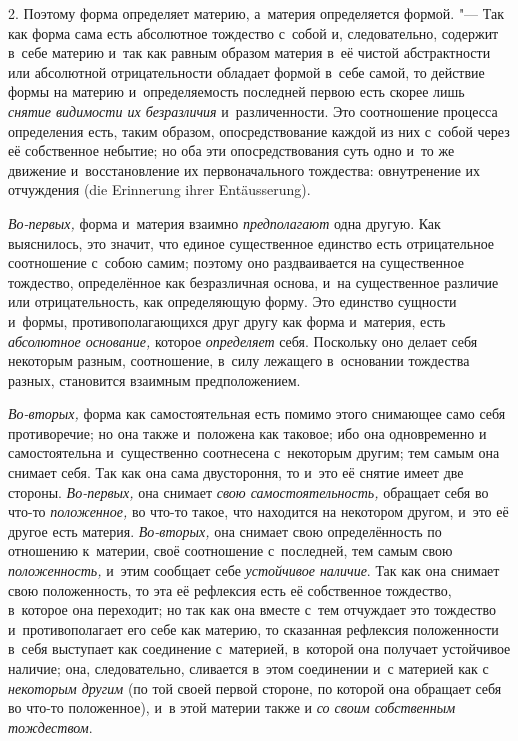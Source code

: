 2. Поэтому форма определяет материю, а~материя определяется формой. "--- Так
как форма сама есть абсолютное тождество с~собой и, следовательно, содержит
в~себе материю и~так как равным образом материя в~её чистой абстрактности или
абсолютной отрицательности обладает формой в~себе самой, то действие формы на
материю и~определяемость последней первою есть скорее лишь
{\em снятие видимости их безразличия} и~различенности. Это соотношение процесса
определения есть, таким образом, опосредствование каждой из них с~собой через
её собственное небытие; но оба эти опосредствования суть одно и~то же движение
и~восстановление их первоначального тождества: овнутренение их отчуждения (die
Erinne\-rung ihrer Entäus\-se\-rung).

{\em Во-первых,} форма и~материя взаимно {\em предполагают} одна другую. Как
выяснилось, это значит, что единое существенное единство есть отрицательное
соотношение с~собою самим; поэтому оно раздваивается на существенное тождество,
определённое как безразличная основа, и~на существенное различие или
отрицательность, как определяющую форму. Это единство сущности и~формы,
противополагающихся друг другу как форма и~материя, есть
{\em абсолютное основание,} которое {\em определяет} себя. Поскольку оно делает
себя некоторым разным, соотношение, в~силу лежащего в~основании тождества
разных, становится взаимным предположением.

{\em Во-вторых,} форма как самостоятельная есть помимо этого снимающее само
себя противоречие; но она также и~положена как таковое; ибо она одновременно и
самостоятельна и~существенно соотнесена с~некоторым другим; тем самым она
снимает себя. Так как она сама двустороння, то и~это её снятие имеет две
стороны. {\em Во-первых,} она снимает {\em свою самостоятельность,} обращает
себя во что-то {\em положенное,} во что-то такое, что находится на некотором
другом, и~это её другое есть материя. {\em Во-вторых,} она снимает свою
определённость по отношению к~материи, своё соотношение с~последней, тем самым
свою {\em положенность,} и~этим сообщает себе {\em устойчивое наличие}. Так как
она снимает свою положенность, то эта её рефлексия есть её собственное
тождество, в~которое она переходит; но так как она вместе с~тем отчуждает это
тождество и~противополагает его себе как материю, то сказанная рефлексия
положенности в~себя выступает как соединение с~материей, в~которой она получает
устойчивое наличие; она, следовательно, сливается в~этом соединении и~с
материей как с {\em некоторым другим} (по той своей первой стороне, по которой
она обращает себя во что-то положенное), и~в этой материи также и
{\em со своим собственным тождеством}.

